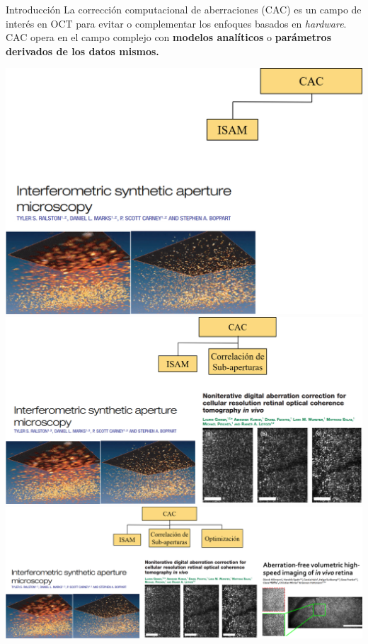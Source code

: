 \documentclass[fleqn,10pt,aspectratio=169,dvipsnames]{beamer}
\begin{document}
\begin{frame}[t]{Introducción}
La corrección computacional de aberraciones (CAC) es un campo de interés en OCT para evitar o complementar los enfoques basados en \textit{hardware}. CAC opera en el campo complejo con \textbf{modelos analíticos} o \textbf{parámetros derivados de los datos mismos.}
	\begin{center}
		\begin{overprint}
\hspace*{-1\baselineskip}
\includegraphics[height=.55\textheight]{../Figuras/ProblemStatement_1.png}
\includegraphics[height=.55\textheight]{../Figuras/ProblemStatement_2.png}
\includegraphics[height=.55\textheight]{../Figuras/ProblemStatement_3.png}

\end{overprint}
\end{center}
\end{frame}
\end{document}
